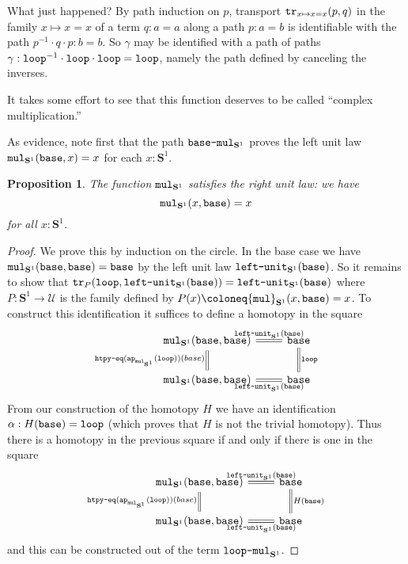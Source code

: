 \documentclass{amsart}
\theoremstyle{theorem}
\newtheorem*{prop}{Proposition}
\theoremstyle{definition}
\theoremstyle{remark}
\newcommand{\0}{\mathbbe{0}}
\newcommand{\1}{\mathbbe{1}}
\newcommand{\2}{\mathbbe{2}}
\newcommand{\3}{\mathbbe{3}}
\newcommand{\4}{\mathbbe{4}}
\newcommand{\term}[1]{{\textup{\texttt{#1}}}}
\newcommand{\ap}{\term{ap}}
\newcommand{\tr}{\term{tr}}
\newcommand{\UU}{{\mathcal{U}}}
\newcommand{\Sone}{\mathbf{S}^1}
\newcommand{\base}{\term{base}}
\newcommand{\lloop}{\term{loop}}
\newcommand{\mul}{\term{mul}}
\begin{document}
What just happened? By path induction on $p$, transport $\tr_{x \mapsto x = x}(p,q)$ in the family $x \mapsto x = x$ of a term $q : a = a$ along a path $p : a = b$ is identifiable with the path $p^{-1}\cdot q \cdot p : b = b$. So $\gamma$ may be identified with a path of paths $\gamma : \lloop^{-1} \cdot \lloop \cdot \lloop = \lloop$, namely the path defined by canceling the inverses.

It takes some effort to see that this function deserves to be called ``complex multiplication.''

As evidence, note first that the path $\term{base-mul}_{\Sone}$ proves the left unit law $\mul_{\Sone}(\base,x) = x$ for each $x : \Sone$.

\begin{prop} The function $\mul_{\Sone}$ satisfies the right unit law: we have
  \[ \mul_{\Sone}(x,\base) = x\]
  for all $x : \Sone$.
\end{prop}
\begin{proof}
We prove this by induction on the circle. In the base case we have $\mul_{\Sone}(\base,\base) = \base$ by the left unit law $\term{left-unit}_{\Sone}(\base)$. So it remains to show that
$\tr_P(\lloop,\term{left-unit}_{\Sone}(\base)) = \term{left-unit}_{\Sone}(\base)$ where $P : \Sone \to \UU$ is the family defined by $P(x) \coloneq \mul_{\Sone}(x,\base) = x$. To construct this identification it suffices to define a homotopy in the square
\[ 
\begin{tikzcd}
  \mul_{\Sone}(\base,\base) \arrow[r, equals, "\term{left-unit}_{\Sone}(\base)"] \arrow[d, equals, "\term{htpy-eq}(\ap_{\mul_{\Sone}}(\lloop))(base)"'] & \base \arrow[d, equals, "\lloop"] \\ \mul_{\Sone}(\base,\base) \arrow[r, equals, "\term{left-unit}_{\Sone}(\base)"'] & \base
\end{tikzcd}
\]
From our construction of the homotopy $H$ we have an identification $\alpha : H(\base) = \lloop$ (which proves that $H$ is not the trivial homotopy). Thus there is a homotopy in the previous square if and only if there is one in the square
\[ 
\begin{tikzcd}
  \mul_{\Sone}(\base,\base) \arrow[r, equals, "\term{left-unit}_{\Sone}(\base)"] \arrow[d, equals, "\term{htpy-eq}(\ap_{\mul_{\Sone}}(\lloop))(base)"'] & \base \arrow[d, equals, "H(\base)"] \\ \mul_{\Sone}(\base,\base) \arrow[r, equals, "\term{left-unit}_{\Sone}(\base)"'] & \base
\end{tikzcd}
\]
and this can be constructed out of the term $\term{loop-mul}_{\Sone}$.
\end{proof}
\end{document}
